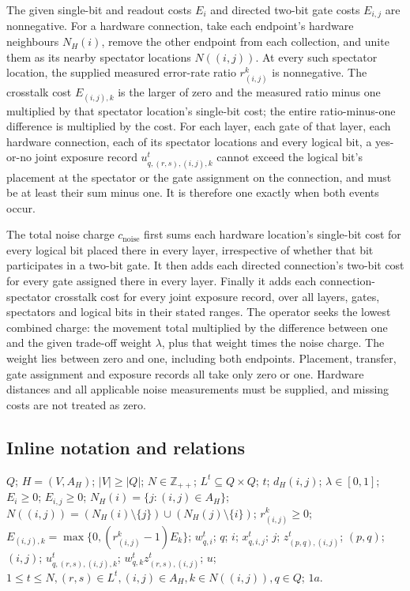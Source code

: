 \documentclass[10pt]{article}
\begin{document}
The given single-bit and readout costs $E_i$ and directed two-bit gate costs $E_{i,j}$ are nonnegative. For a hardware connection, take each endpoint's hardware neighbours $N_H(i)$, remove the other endpoint from each collection, and unite them as its nearby spectator locations $N((i,j))$. At every such spectator location, the supplied measured error-rate ratio $r_{(i,j)}^k$ is nonnegative. The crosstalk cost $E_{(i,j),k}$ is the larger of zero and the measured ratio minus one multiplied by that spectator location's single-bit cost; the entire ratio-minus-one difference is multiplied by the cost. For each layer, each gate of that layer, each hardware connection, each of its spectator locations and every logical bit, a yes-or-no joint exposure record $u_{q,(r,s),(i,j),k}^t$ cannot exceed the logical bit's placement at the spectator or the gate assignment on the connection, and must be at least their sum minus one. It is therefore one exactly when both events occur.

The total noise charge $c_{\mathrm{noise}}$ first sums each hardware location's single-bit cost for every logical bit placed there in every layer, irrespective of whether that bit participates in a two-bit gate. It then adds each directed connection's two-bit cost for every gate assigned there in every layer. Finally it adds each connection-spectator crosstalk cost for every joint exposure record, over all layers, gates, spectators and logical bits in their stated ranges. The operator seeks the lowest combined charge: the movement total multiplied by the difference between one and the given trade-off weight $\lambda$, plus that weight times the noise charge. The weight lies between zero and one, including both endpoints. Placement, transfer, gate assignment and exposure records all take only zero or one. Hardware distances and all applicable noise measurements must be supplied, and missing costs are not treated as zero.

\subsection*{Inline notation and relations}
$Q$; $H=(V,A_H)$; $|V|\ge|Q|$; $N\in\mathbb Z_{++}$; $L^t\subseteq Q\times Q$; $t$; $d_H(i,j)$; $\lambda\in[0,1]$; $E_i\ge0$; $E_{i,j}\ge0$; $N_H(i)=\{j:(i,j)\in A_H\}$; $N((i,j))=(N_H(i)\setminus\{j\})\cup(N_H(j)\setminus\{i\})$; $r_{(i,j)}^k\ge0$; $E_{(i,j),k}=\max\{0,(r_{(i,j)}^k-1)E_k\}$; $w_{q,i}^t$; $q$; $i$; $x_{q,i,j}^t$; $j$; $z_{(p,q),(i,j)}^t$; $(p,q)$; $(i,j)$; $u_{q,(r,s),(i,j),k}^t$; $w_{q,k}^tz_{(r,s),(i,j)}^t$; $u$; $1\le t\le N,(r,s)\in L^t,(i,j)\in A_H,k\in N((i,j)),q\in Q$; $1a$.
\end{document}
